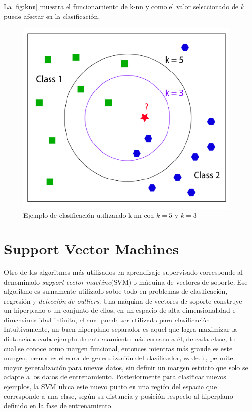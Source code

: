 La \autoref{fig:knn} muestra el funcionamiento de k-nn y como el valor seleccionado de $k$ puede afectar en la clasificación.

\newpage

\begin{figure}[ht!]
\centering
\includegraphics[width=.6\textwidth]{figures/knn.png}
\caption[Clasificación utilizando K-NN]{Ejemplo de clasificación utilizando k-nn con $k=5$ y $k=3$}
\label{fig:knn}
\end{figure}

\section{Support Vector Machines}

Otro de los algoritmos más utilizados en aprendizaje supervisado corresponde al denominado \textit{support vector machine}(SVM) o máquina de vectores de soporte. Ese algoritmo es sumamente utilizado sobre todo en problemas de clasificación, regresión y \textit{detección de outliers}. Una máquina de vectores de soporte construye un hiperplano o un conjunto de ellos, en un espacio de alta dimensionalidad o dimensionalidad infinita, el cual puede ser utilizado para clasificación. Intuitivamente, un buen hiperplano separador es aquel que logra maximizar la distancia a cada ejemplo de entrenamiento más cercano a él, de cada clase, lo cual se conoce como margen funcional, entonces mientras más grande es este margen, menor es el error de generalización del clasificador, es decir, permite mayor generalización para nuevos datos, sin definir un margen estricto que solo se adapte a los datos de entrenamiento. Posteriormente para clasificar nuevos ejemplos, la SVM ubica este nuevo punto en una región del espacio que corresponde a una clase, según su distancia y posición respecto al hiperplano definido en la fase de entrenamiento.

